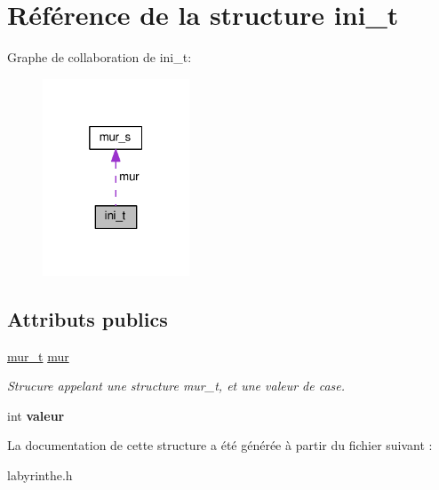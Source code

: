 \hypertarget{structini__t}{}\section{Référence de la structure ini\+\_\+t}
\label{structini__t}


Graphe de collaboration de ini\+\_\+t\+:\nopagebreak
\begin{figure}[H]
\begin{center}
\leavevmode
\includegraphics[width=124pt]{structini__t__coll__graph}
\end{center}
\end{figure}
\subsection*{Attributs publics}
\begin{DoxyCompactItemize}
\item 
\hyperlink{structmur__s}{mur\+\_\+t} \hyperlink{structini__t_a05761ad37f05a88ecaa33a8c380aacda}{mur}\hypertarget{structini__t_a05761ad37f05a88ecaa33a8c380aacda}{}\label{structini__t_a05761ad37f05a88ecaa33a8c380aacda}

\begin{DoxyCompactList}\small\item\em Strucure appelant une structure mur\+\_\+t, et une valeur de case. \end{DoxyCompactList}\item 
int {\bfseries valeur}\hypertarget{structini__t_a1465159977fe10d194f9117c8c664834}{}\label{structini__t_a1465159977fe10d194f9117c8c664834}

\end{DoxyCompactItemize}


La documentation de cette structure a été générée à partir du fichier suivant \+:\begin{DoxyCompactItemize}
\item 
labyrinthe.\+h\end{DoxyCompactItemize}
